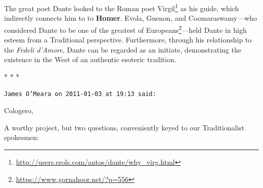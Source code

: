 The great poet Dante looked to the Roman poet Virgil\footnote{\url{http://users.erols.com/antos/dante/why\_virg.html}} as his guide, which indirectly connects him to to \textbf{Homer}. Evola, Guenon, and Coomaraswamy---who considered Dante to be one of the greatest of Europeans\footnote{\url{https://www.gornahoor.net/?p=556}}---held Dante in high esteem from a Traditional perspective. Furthermore, through his relationship to the \emph{Fedeli d'Amore}, Dante can be regarded as an initiate, demonstrating the existence in the West of an authentic esoteric tradition.



\begin{center}* * *\end{center}

\begin{footnotesize}
\begin{sffamily}
\texttt{James O'Meara on 2011-01-03 at 19:13 said:}

Cologero,

A worthy project, but two questions, conveniently keyed to our Traditionalist spokesmen:


\end{sffamily}
\end{footnotesize}
